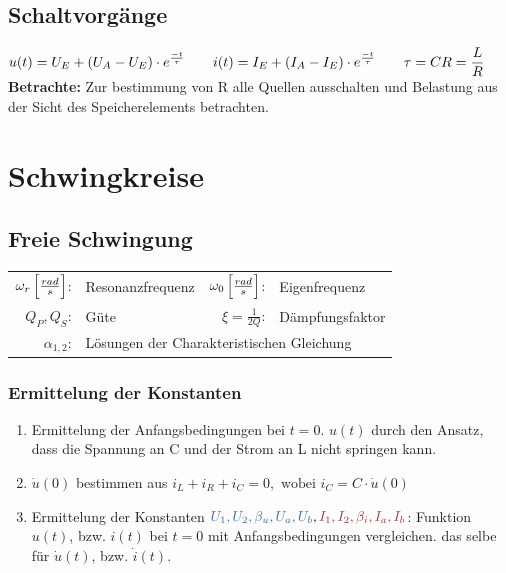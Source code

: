 \documentclass{article}
\begin{document}
\begin{twocolumn}
\subsection{Schaltvorgänge}
$\displaystyle u(t) = U_E + (U_A -U_E) \cdot e^{\frac{-t}{\tau}} \qquad i(t) = I_E + (I_A -I_E)
\cdot e^{\frac{-t}{\tau}} \qquad \tau = CR = \frac{L}{R}$
\textbf{Betrachte:} Zur bestimmung von R alle Quellen ausschalten und Belastung aus der
Sicht des Speicherelements betrachten.

\section{Schwingkreise}

\subsection{Freie Schwingung}

\begin{definition}
\begin{tabular}{rl|rl}
$\omega_r \left[\frac{rad}{s}\right]$: & Resonanzfrequenz &
$\omega_0 \left[\frac{rad}{s}\right]$: & Eigenfrequenz \\
$Q_P, Q_S$: & Güte &
$\xi = \frac{1}{2Q}$:  & Dämpfungsfaktor \\
$\alpha_{1,2}$: & \multicolumn{3}{l}{Lösungen der Charakteristischen Gleichung}
\end{tabular}
\end{definition}

\subsubsection{Ermittelung der Konstanten}

\begin{enumerate}
  \item Ermittelung der Anfangsbedingungen bei $t = 0$. $u(t)$ durch den Ansatz, dass die
  Spannung an C und der Strom an L nicht springen kann. 
  \item $\dot{u}(0)$ bestimmen aus $i_L + i_R + i_C = 0, \text{ wobei } i_C = C \cdot
  \dot{u}(0)$
  \item Ermittelung der Konstanten $\textcolor{cBlue}{U_1, U_2, \beta_u, U_a, U_b},
  \textcolor{cRed}{I_1, I_2, \beta_i, I_a, I_b}$: \newline 
  Funktion $u(t)$, bzw. $i(t)$ bei $t = 0$
  mit Anfangsbedingungen vergleichen. das selbe für $\dot{u}(t)$, bzw. $\dot{i}(t)$.
\end{enumerate}


\end{twocolumn}
\end{document}
